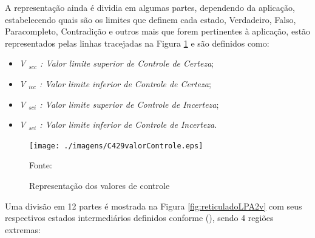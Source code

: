 A representação ainda é dividia em algumas partes, dependendo da aplicação, estabelecendo quais são os limites que definem cada estado, Verdadeiro, Falso, Paracompleto, Contradição e outros mais que forem pertinentes à aplicação, estão representados pelas linhas tracejadas na Figura \ref{fig:valorControle} e são definidos como:

\begin{itemize}
\item \emph{V $_{scc}$ : Valor limite superior de Controle de Certeza};
\item \emph{V $_{icc}$ : Valor limite inferior de Controle de Certeza};
\item \emph{V $_{sci}$ : Valor limite superior de Controle de Incerteza};
\item \emph{V $_{sci}$ : Valor limite inferior de Controle de Incerteza}.

\end{itemize}

\begin{figure}[!htb]
\caption{Representação dos valores de controle}
\center\texttt{[image: ./imagens/C429valorControle.eps]}
\label{fig:valorControle}

{\small Fonte: \cite{JoaoInacio}}
\end{figure}

Uma divisão em 12 partes é mostrada na Figura \ref{fig:reticuladoLPA2v} com seus respectivos estados intermediários definidos conforme \citeauthor{JoaoInacio}(\citeyear{JoaoInacio}), sendo 4 regiões extremas:





